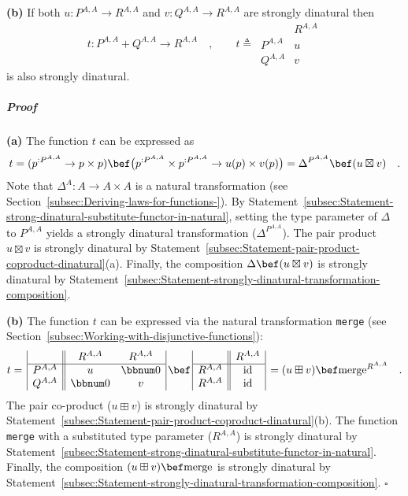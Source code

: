 \textbf{(b)} If both $u:P^{A,A}\rightarrow R^{A,A}$ and $v:Q^{A,A}\rightarrow R^{A,A}$
are strongly dinatural then
\[
t:P^{A,A}+Q^{A,A}\rightarrow R^{A,A}\quad,\quad\quad t\triangleq\,\begin{array}{|c||c|}
 & R^{A,A}\\
\hline P^{A,A} & u\\
Q^{A,A} & v
\end{array}
\]
is also strongly dinatural.

\subparagraph{Proof}

\textbf{(a)} The function $t$ can be expressed as
\[
t=(p^{:P^{A,A}}\rightarrow p\times p)\bef\big(p^{:P^{A,A}}\times p^{:P^{A,A}}\rightarrow u(p)\times v(p)\big)=\Delta^{P^{A,A}}\bef(u\boxtimes v)\quad.
\]
Note that $\Delta^{A}:A\rightarrow A\times A$ is a natural transformation
(see Section~\ref{subsec:Deriving-laws-for-functions-}). By Statement~\ref{subsec:Statement-strong-dinatural-substitute-functor-in-natural},
setting the type parameter of $\Delta$ to $P^{A,A}$ yields a strongly
dinatural transformation ($\Delta^{P^{A,A}}$). The pair product $u\boxtimes v$
is strongly dinatural by Statement~\ref{subsec:Statement-pair-product-coproduct-dinatural}(a).
Finally, the composition $\Delta\bef(u\boxtimes v)$ is strongly dinatural
by Statement~\ref{subsec:Statement-strongly-dinatural-transformation-composition}.

\textbf{(b)} The function $t$ can be expressed via the natural transformation
\lstinline!merge! (see Section~\ref{subsec:Working-with-disjunctive-functions}):
\[
t=\,\begin{array}{|c||cc|}
 & R^{A,A} & R^{A,A}\\
\hline P^{A,A} & u & \bbnum 0\\
Q^{A,A} & \bbnum 0 & v
\end{array}\,\bef\,\begin{array}{|c||c|}
 & R^{A,A}\\
\hline R^{A,A} & \text{id}\\
R^{A,A} & \text{id}
\end{array}\,=(u\boxplus v)\bef\text{merge}^{R^{A,A}}\quad.
\]
The pair co-product ($u\boxplus v$) is strongly dinatural by Statement~\ref{subsec:Statement-pair-product-coproduct-dinatural}(b).
The function \lstinline!merge! with a substituted type parameter
($R^{A,A}$) is strongly dinatural by Statement~\ref{subsec:Statement-strong-dinatural-substitute-functor-in-natural}.
Finally, the composition $(u\boxplus v)\bef\text{merge}$ is strongly
dinatural by Statement~\ref{subsec:Statement-strongly-dinatural-transformation-composition}.
$\square$

